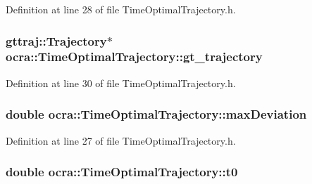 Definition at line 28 of file Time\+Optimal\+Trajectory.\+h.

\subsubsection[{\texorpdfstring{gt\+\_\+trajectory}{gt_trajectory}}]{\setlength{\rightskip}{0pt plus 5cm}gttraj\+::\+Trajectory$\ast$ ocra\+::\+Time\+Optimal\+Trajectory\+::gt\+\_\+trajectory\hspace{0.3cm}{\ttfamily [protected]}}\hypertarget{classocra_1_1TimeOptimalTrajectory_a350a0c047e3f65fc7dd55d6b5dfa5796}{}\label{classocra_1_1TimeOptimalTrajectory_a350a0c047e3f65fc7dd55d6b5dfa5796}


Definition at line 30 of file Time\+Optimal\+Trajectory.\+h.

\subsubsection[{\texorpdfstring{max\+Deviation}{maxDeviation}}]{\setlength{\rightskip}{0pt plus 5cm}double ocra\+::\+Time\+Optimal\+Trajectory\+::max\+Deviation\hspace{0.3cm}{\ttfamily [protected]}}\hypertarget{classocra_1_1TimeOptimalTrajectory_a7709c9a5e8ab5e48657cc965f59d0f57}{}\label{classocra_1_1TimeOptimalTrajectory_a7709c9a5e8ab5e48657cc965f59d0f57}


Definition at line 27 of file Time\+Optimal\+Trajectory.\+h.

\subsubsection[{\texorpdfstring{t0}{t0}}]{\setlength{\rightskip}{0pt plus 5cm}double ocra\+::\+Time\+Optimal\+Trajectory\+::t0\hspace{0.3cm}{\ttfamily [protected]}}\hypertarget{classocra_1_1TimeOptimalTrajectory_a7c58d1493c4227bb5d209de36ade154e}{}\label{classocra_1_1TimeOptimalTrajectory_a7c58d1493c4227bb5d209de36ade154e}


